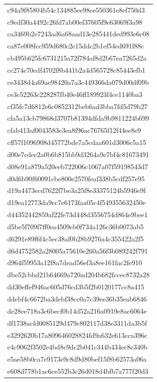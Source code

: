 \begin{tabular}{l}
c94a9f85804b54c134885ee98ce550361e8ef750d3 \\
c9edf30a4492c26fd7ab00ef37605f9e63069f3a98 \\
ca3469b2e7243ad6a68aad13e285441ded993e6c08 \\
ca87e008fcc959d680c2e15ddc2b1ef54ed691f88c \\
cb495b625fc6731215a72f784af8d2b67ea7265d2a \\
cc274e70cdf4702f8b441b2a4d565728c85443efb1 \\
ce3438d4a69ae98420a7a3c449366da079d00df09b \\
ce3c52263c228287fb40e46ff189923f4ce1140ba3 \\
cf35fc7d6812e6c0852312beb6ad3bba7fd5d79b27 \\
cfa5a13cb79868d3707b81394dfda9b9811224b699 \\
cfab413af0043583e3ea8f96ac76765f12f44ee8e9 \\
cff57f1096908d45772bde7a5cdaa601d3006c5a15 \\
d00e7cdee2a0b6b815bb9d3264a9e7bf4c81673491 \\
d08e91a879a520eeb722006c1067a07f59198543d7 \\
d0d6b90f60091cbe800e2570feaf338b5cdf257e95 \\
d19a4473ecd7622f7be3a25f8e33375124b5946e9f \\
d19ea12773da9ec7e6173faa05c4f549355632450e \\
d44352442859af22fe73d448d3556754d864e9bee1 \\
d5be5f709f7ff0ea4509eb0f734a126c36b0073ab5 \\
d6291e89f6f4c5ec38af0b28b9276a4c355422a2f5 \\
d6d4752582a28005a75610e260a56f3b089242f791 \\
d964f59953a12f8a7dead56ef3a8ee161fac2fe910 \\
dbe52cbbd21b64669a720ad204b682fccec8732a28 \\
dd30effef946ac605d76cd3b5f2b0120177cc8a415 \\
ddebf4c6672ba3debf38cc0a7c39ee36b35eab6846 \\
de28ee718a3c6becf0b14d52a216a0919e8ac6064e \\
df1738acfd0085129d479c802117d38e3311da3b5f \\
e3292620b17a809646028824fd9a632e613cca396c \\
e4c9062f3502e4bd8c9dc2b041c344b434ec8c340b \\
e5ae58b0ca7e9173e9c8d9d80bef15f8b62573a06a \\
e608d778b1ac6ce552b3c26d018d4bfb7a777f20d3 \\

\end{tabular}
